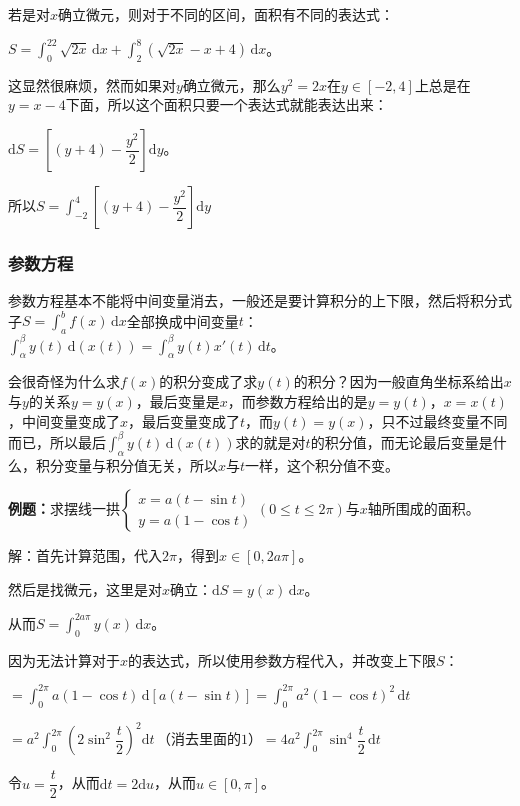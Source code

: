 \documentclass[UTF8, 12pt]{ctexart}
\begin{document}
若是对$x$确立微元，则对于不同的区间，面积有不同的表达式：

$S=\int_0^22\sqrt{2x}\,\textrm{d}x+\int_2^8(\sqrt{2x}-x+4)\,\textrm{d}x$。

这显然很麻烦，然而如果对$y$确立微元，那么$y^2=2x$在$y\in[-2,4]$上总是在$y=x-4$下面，所以这个面积只要一个表达式就能表达出来：

$\textrm{d}S=\left[(y+4)-\dfrac{y^2}{2}\right]\textrm{d}y$。

所以$S=\displaystyle{\int_{-2}^4\left[(y+4)-\dfrac{y^2}{2}\right]\textrm{d}y}$

\subsubsection{参数方程}

参数方程基本不能将中间变量消去，一般还是要计算积分的上下限，然后将积分式子$S=\int_a^bf(x)\,\textrm{d}x$全部换成中间变量$t$：$\int_\alpha^\beta y(t)\,\textrm{d}(x(t))=\int_\alpha^\beta y(t)x'(t)\,\textrm{d}t$。

会很奇怪为什么求$f(x)$的积分变成了求$y(t)$的积分？因为一般直角坐标系给出$x$与$y$的关系$y=y(x)$，最后变量是$x$，而参数方程给出的是$y=y(t)$，$x=x(t)$，中间变量变成了$x$，最后变量变成了$t$，而$y(t)=y(x)$，只不过最终变量不同而已，所以最后$\int_\alpha^\beta y(t)\,\textrm{d}(x(t))$求的就是对$t$的积分值，而无论最后变量是什么，积分变量与积分值无关，所以$x$与$t$一样，这个积分值不变。

\textbf{例题：}求摆线一拱$\left\{\begin{array}{l}
    x=a(t-\sin t) \\
    y=a(1-\cos t)
\end{array}
\right.$$(0\leqslant t\leqslant 2\pi)$与$x$轴所围成的面积。\medskip

解：首先计算范围，代入$2\pi$，得到$x\in[0,2a\pi]$。

然后是找微元，这里是对$x$确立：$\textrm{d}S=y(x)\,\textrm{d}x$。

从而$S=\int_0^{2a\pi}y(x)\,\textrm{d}x$。

因为无法计算对于$x$的表达式，所以使用参数方程代入，并改变上下限$S$：

$=\int_0^{2\pi}a(1-\cos t)\,\textrm{d}[a(t-\sin t)]=\int_0^{2\pi}a^2(1-\cos t)^2\,\textrm{d}t$

$=a^2\displaystyle{\int_0^{2\pi}\left(2\sin^2\dfrac{t}{2}\right)^2\textrm{d}t}\,\text{（消去里面的1）}=4a^2\displaystyle{\int_0^{2\pi}\sin^4\dfrac{t}{2}\,\textrm{d}t}$

令$u=\dfrac{t}{2}$，从而$\textrm{d}t=2\textrm{d}u$，从而$u\in[0,\pi]$。
\end{document}
